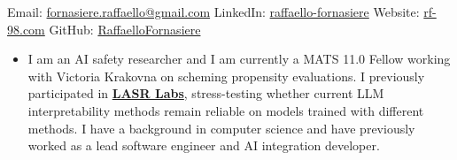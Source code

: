 \documentclass[a4paper,9pt]{article}
\newcommand{\cvsection}[2]{
    \vspace{0.3cm} %
    \noindent {\large \textbf{#1}} %
    \begin{itemize}
        \renewcommand{\labelitemi}{}
        \small #2 %
    \end{itemize}
}
\begin{document}

\vspace{0.2cm}
\noindent
\begin{minipage}{\linewidth}
    \begin{center}
        Email: \href{mailto:fornasiere.raffaello@gmail.com}{fornasiere.raffaello@gmail.com} \hfill
        LinkedIn: \href{https://linkedin.com/in/raffaello-fornasiere}{raffaello-fornasiere} \hfill
        Website: \href{https://rf-98.com}{rf-98.com}\hfill
        GitHub: \href{https://github.com/RaffaelloFornasiere}{RaffaelloFornasiere}\hfill
    \end{center}
\end{minipage}

\cvsection{Summary}{
    \item I am an AI safety researcher and I am currently a MATS 11.0 Fellow working with Victoria Krakovna on scheming propensity evaluations. I previously participated in \href{https://lasrlabs.org}{\textbf{LASR Labs}}, stress-testing whether current LLM interpretability methods remain reliable on models trained with different methods. I have a background in computer science and have previously worked as a lead software engineer and AI integration developer.
}
\end{document}
